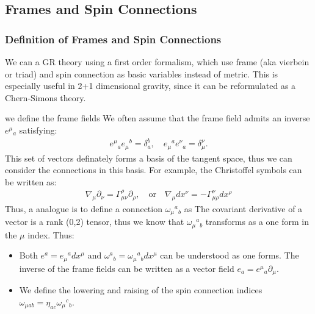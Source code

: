 \subsection{Frames and Spin Connections}

\subsubsection{Definition of Frames and Spin Connections}

We can a GR theory using a first order formalism, which use frame (aka vierbein or triad) and spin connection as basic variables instead of metric. This is especially useful in 2+1 dimensional gravity, since it can be reformulated as a Chern-Simons theory. 

we define the frame fields 
We often assume that the frame field admits an inverse $ {e^\mu}_a $ satisfying:
\begin{align}
  {e^\mu}_a e_\mu{}^b = \delta_a^b, \quad e_\mu{}^a {e^\nu}_a = \delta_\mu^\nu.
\end{align}
This set of vectors definately forms a basis of the tangent space, thus we can consider the connections in this basis. For example, the Christoffel symbols can be written as:
\begin{align}
  \nabla_\mu \partial_{\nu} = \Gamma_{\mu\nu}^\rho \partial_\rho, \quad \text{or}\quad \nabla_\mu dx^{\nu} = -\Gamma_{\mu\rho}^\nu dx^\rho 
\end{align}
Thus, a analogue is to define a connection $ \omega_\mu{}^a{}_b $ as
The covariant derivative of a vector is a rank (0,2) tensor, thus we know that $ \omega_\mu{}^a{}_b $ transforms as a one form in the $ \mu $ index. Thus:
\begin{itemize}
  \item Both $ e^a = e_\mu{}^a dx^\mu $ and $ \omega^a{}_b = \omega_\mu{}^a{}_b dx^\mu $ can be understood as one forms. The inverse of the frame fields can be written as a vector field $ e_a = {e^\mu}_a \partial_\mu $.
  \item We define the lowering and raising of the spin connection indices $ \omega_{\mu ab} = \eta_{ac}\omega_\mu{}^c{}_b $. 
\end{itemize}

